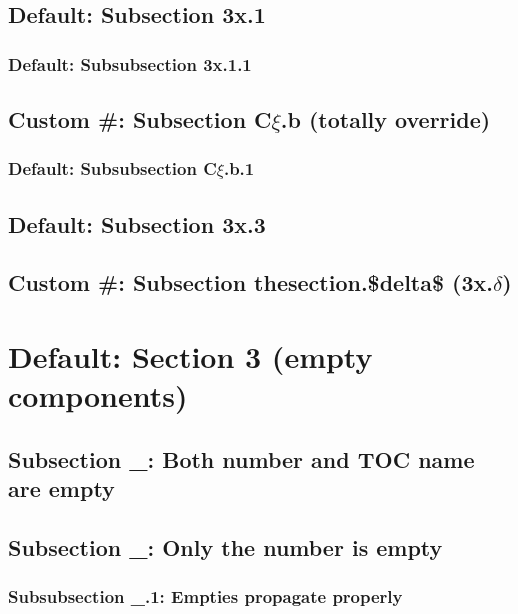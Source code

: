 \documentclass{homework}
\begin{document}
\subsection{Default: Subsection 3x.1}

\subsubsection{Default: Subsubsection 3x.1.1}

\subsection[C$\xi$.b|]{Custom \#: Subsection C$\xi$.b (totally override)}

\subsubsection{Default: Subsubsection C$\xi$.b.1}

\subsection{Default: Subsection 3x.3}

\subsection[\thesection.$\delta$|]{Custom \#: Subsection thesection.\$delta\$ (3x.$\delta$)}

\section{Default: Section 3 (empty components)}

\subsection[|]{Subsection \_: Both number and TOC name are empty}

\subsection[|Subsection \_: Only the number is empty (custom)]{Subsection \_: Only the number is empty}

\subsubsection{Subsubsection \_.1: Empties propagate properly}
\end{document}
